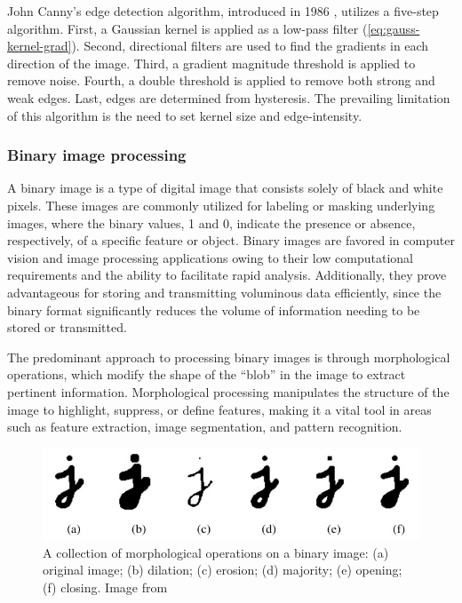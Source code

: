 John Canny's edge detection algorithm, introduced in 1986 \cite{cannyComputationalApproachEdge1986}, utilizes a five-step algorithm.
First, a Gaussian kernel is applied as a low-pass filter (\cref{eq:gauss-kernel-grad}).
Second, directional filters are used to find the gradients in each direction of the image.
Third, a gradient magnitude threshold is applied to remove noise.
Fourth, a double threshold is applied to remove both strong and weak edges.
Last, edges are determined from hysteresis.
The prevailing limitation of this algorithm is the need to set kernel size and edge-intensity.

\subsubsection{Binary image processing}
\label{sec:binary-img-proc}

A binary image is a type of digital image that consists solely of black and white pixels.
These images are commonly utilized for labeling or masking underlying images, where the binary values, 1 and 0, indicate the presence or absence, respectively, of a specific feature or object.
Binary images are favored in computer vision and image processing applications owing to their low computational requirements and the ability to facilitate rapid analysis.
Additionally, they prove advantageous for storing and transmitting voluminous data efficiently, since the binary format significantly reduces the volume of information needing to be stored or transmitted.

The predominant approach to processing binary images is through morphological operations, which modify the shape of the ``blob'' in the image to extract pertinent information.
Morphological processing manipulates the structure of the image to highlight, suppress, or define features, making it a vital tool in areas such as feature extraction, image segmentation, and pattern recognition.

\begin{figure}[h!]
    \includegraphics[width = \linewidth]{figs/background/png/binary-image-processing.jpg}
    \caption[A collection of morphological operations on a binary image]{A collection of morphological operations on a binary image: (a) original image; (b) dilation; (c) erosion; (d) majority; (e) opening; (f) closing. Image from \cite{szeliskiComputerVisionAlgorithms2022}}
    \label{fig:binary-image-processing}
\end{figure}

